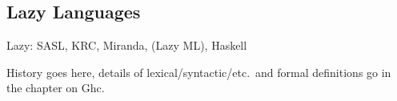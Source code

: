\subsection{Lazy Languages}
Lazy: SASL, KRC, Miranda, (Lazy ML), Haskell

History goes here, details of lexical/syntactic/etc.~and formal definitions go in the chapter on Ghc.